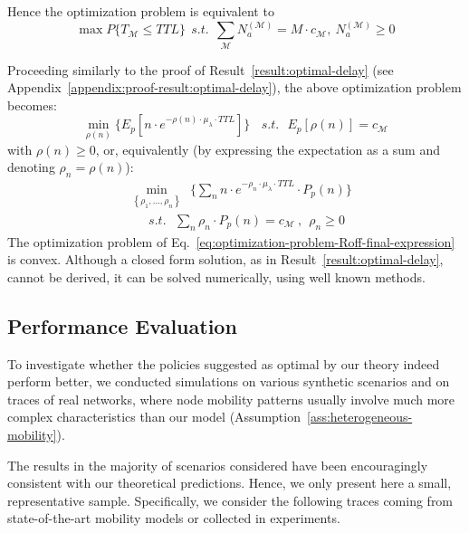 \documentclass[journal]{IEEEtran}
\newcommand{\eq}[1]{Eq.~\eqref{#1}}
\newcommand{\Na}{N_{a}^{(\mathcal{M})}}
\begin{document}
Hence the optimization problem is equivalent to
\begin{equation}
 \max P\lbrace T_{\mathcal{M}} \leq TTL\rbrace~~s.t.~~\sum_{\mathcal{M}} \Na= M\cdot c_{\mathcal{M}},~\Na\geq0\nonumber
\end{equation}



Proceeding similarly to the proof of Result~\ref{result:optimal-delay} (see Appendix~\ref{appendix:proof-result:optimal-delay}), the above optimization problem becomes:
\begin{equation}
 \min_{\rho(n)}\lbrace E_{p}\left[n\cdot e^{-\rho(n)\cdot\mu_{\lambda}\cdot TTL}\right]\rbrace ~~~~s.t.~~~E_{p}[\rho(n)]= c_{\mathcal{M}}
\end{equation}
with $\rho(n)\geq0$, or, equivalently (by expressing the expectation as a sum and denoting $\rho_{n} = \rho(n)$):
\begin{align}\label{eq:optimization-problem-Roff-final-expression}
& \textstyle\min_{\left\{\rho_{1},...,{\rho_{n}}\right\}}~~\lbrace\sum_{n}n\cdot e^{-\rho_{n}\cdot\mu_{\lambda}\cdot TTL}\cdot P_{p}(n)\rbrace\nonumber\\ 
&\textstyle~~~~~~~s.t.~~~\sum_{n}\rho_{n}\cdot P_{p}(n)= c_{\mathcal{M}}~,~~\rho_{n}\geq0
\end{align}
The optimization problem of \eq{eq:optimization-problem-Roff-final-expression} is convex. Although a closed form solution, as in Result~\ref{result:optimal-delay}, cannot be derived, it can be solved numerically, using well known methods.







\subsection{Performance Evaluation}\label{sec:offloading-evaluation}
To investigate whether the policies suggested as optimal by our theory indeed perform better, we conducted simulations on various synthetic scenarios and on traces of real networks, where node mobility patterns usually involve much more complex characteristics than our model (Assumption~\ref{ass:heterogeneous-mobility}).


The results in the majority of scenarios considered have been encouragingly consistent with our theoretical predictions. Hence, we only present here a small, representative sample. Specifically, we consider the following traces coming from state-of-the-art mobility models or collected in experiments.
\end{document}
